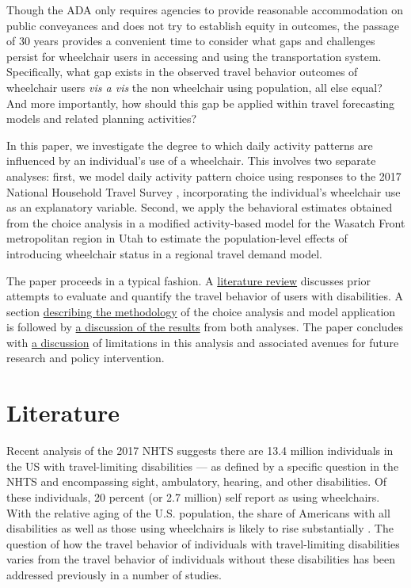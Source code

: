 \documentclass[3p, authoryear, review]{elsarticle} %
\begin{document}
Though the ADA only requires agencies to provide reasonable accommodation on
public conveyances and does not try to establish equity in outcomes, the passage
of 30 years provides a convenient time to consider what gaps and challenges
persist for wheelchair users in accessing and using the transportation system.
Specifically, what gap exists in the observed travel behavior outcomes of
wheelchair users \emph{vis a vis} the non wheelchair using population, all else equal?
And more importantly, how should this gap be applied within travel forecasting
models and related planning activities?

In this paper, we investigate the degree to which daily activity patterns are
influenced by an individual's use of a wheelchair. This involves two separate
analyses: first, we model daily activity pattern choice using responses to the
2017 National Household Travel Survey \citep{fhwa2017}, incorporating the individual's
wheelchair use as an explanatory variable. Second, we apply the behavioral
estimates obtained from the choice analysis in a modified activity-based model
for the Wasatch Front metropolitan region in Utah to estimate the
population-level effects of introducing wheelchair status in a regional travel
demand model.

The paper proceeds in a typical fashion. A \protect\hyperlink{literature}{literature review}
discusses prior attempts to evaluate and quantify the travel behavior of
users with disabilities. A section \protect\hyperlink{methodology}{describing the methodology}
of the choice analysis and model application is followed by \protect\hyperlink{results}{a discussion of the results}
from both analyses. The paper concludes with \protect\hyperlink{discussion}{a discussion}
of limitations in this analysis and associated avenues for future research and
policy intervention.

\hypertarget{sec-literature}{%
\section{Literature}\label{sec-literature}}

Recent analysis \citep{Brumbaugh2018} of the 2017 NHTS \citep{fhwa2017} suggests there are 13.4
million individuals in the US with travel-limiting disabilities --- as defined by a
specific question in the NHTS and encompassing sight, ambulatory, hearing, and
other disabilities. Of these individuals, 20 percent (or 2.7
million) self report as using wheelchairs. With the relative aging of the U.S.
population, the share of Americans with all disabilities as well as those using
wheelchairs is likely to rise substantially \citep{Sweeney2004, Laplante2003}.
The question of how the travel behavior of individuals with travel-limiting
disabilities varies from the travel behavior of individuals without these
disabilities has been addressed previously in a number of studies.
\end{document}
